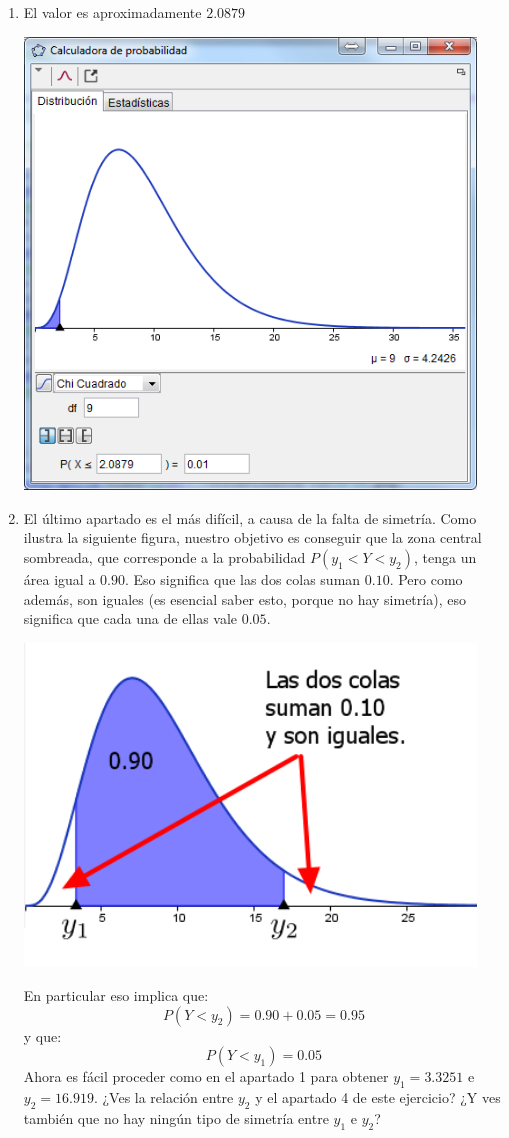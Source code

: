 \documentclass[10pt,a4paper]{article}\usepackage[]{graphicx}\usepackage[]{color}
\begin{document}
\begin{enumerate}
  \item El valor es aproximadamente $2.0879$\quad\\
    \begin{center}
    \includegraphics[width=12cm]{../fig/Tut06-34.png}
    \end{center}

  \item El último apartado es el más difícil, a causa de la falta de simetría. Como ilustra la siguiente figura, nuestro objetivo es conseguir que la zona central sombreada, que corresponde a la probabilidad $P(y_1 < Y < y_2)$, tenga un área igual a $0.90$. Eso significa que las dos colas suman $0.10$. Pero como además, son iguales (es esencial saber esto, porque no hay simetría), eso significa que cada una de ellas vale $0.05$.
    \begin{center}
    \includegraphics[width=12cm]{../fig/Tut06-35.png}
    \end{center}
    En particular eso implica que:
    \[P(Y < y_2) = 0.90 + 0.05 = 0.95\]
    y que:
    \[P(Y < y_1) =  0.05\]
    Ahora es fácil proceder como en el apartado 1 para obtener $y_1 = 3.3251$ e $y_2=16.919$. ¿Ves la relación entre $y_2$ y el apartado 4 de este ejercicio? ¿Y ves también que no hay ningún tipo de simetría entre $y_1$ e $y_2$?

\end{enumerate}
\end{document}
